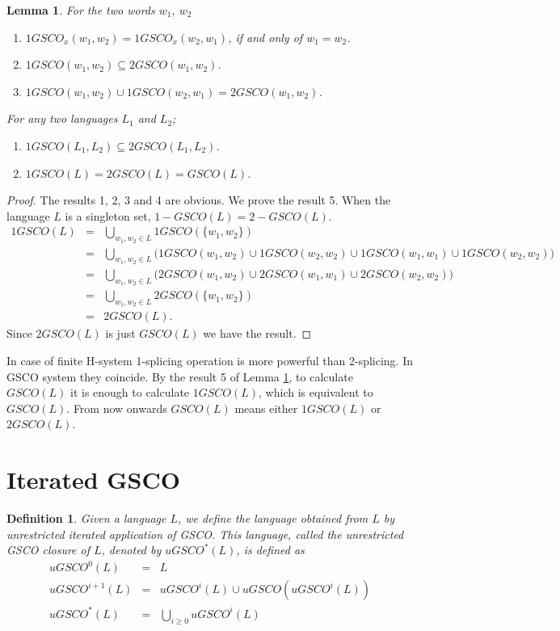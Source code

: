\documentclass{llncs}
\newtheorem{defin}{Definition}
\newtheorem{lem}{Lemma}
\begin{document}
\begin{lem}\label{mew}
For the two words $w_1,~w_2$
\begin{enumerate}
\item $1GSCO_x(w_1,w_2)=1GSCO_x(w_2,w_1)$, if and only of $w_1=w_2$.
\item $1GSCO(w_1,w_2)\subseteq2GSCO(w_1,w_2)$.
\item $1GSCO(w_1,w_2)\cup 1GSCO(w_2,w_1)=2GSCO(w_1,w_2)$.
\end{enumerate}
For any two languages $L_1$ and $L_2$;
\begin{enumerate}
\item[4.] $1GSCO(L_1,L_2)\subseteq2GSCO(L_1,L_2)$.
\item[5.] $1GSCO(L)=2GSCO(L)=GSCO(L)$.
\end{enumerate}

\end{lem}
\begin{proof}
The results 1, 2, 3 and 4 are obvious. We prove the result 5. When
the language $L$ is a singleton set, $1-GSCO(L)= 2-GSCO(L)$.
\begin{eqnarray*}
1GSCO(L)&=&\bigcup_{w_1,w_2\in L}1GSCO(\{w_1,w_2\})\\
    &=&\bigcup_{w_1,w_2\in L}\big(1GSCO(w_1,w_2)\cup1GSCO(w_2,w_2)\cup1GSCO(w_1,w_1)\cup1GSCO(w_2,w_2)\big)\\
    &=&\bigcup_{w_1,w_2\in L}\big(2GSCO(w_1,w_2)\cup2GSCO(w_1,w_1)\cup2GSCO(w_2,w_2) \big)\\
    &=&\bigcup_{w_1,w_2\in L}2GSCO(\{w_1,w_2\})\\
    &=&2GSCO(L).
\end{eqnarray*}
Since $2GSCO(L)$ is just $GSCO(L)$ we have the result.
\end{proof}
\par In case of finite H-system 1-splicing operation is more powerful than 2-splicing.
In GSCO system they coincide. By the  result 5 of Lemma \ref{mew}, to calculate $GSCO(L)$
it is enough to calculate $1GSCO(L)$, which is equivalent to  $GSCO(L)$. From now onwards
$GSCO(L)$ means either $1GSCO(L)$ or $2GSCO(L)$.
\section{Iterated GSCO}
\begin{defin}
Given a language $L$, we define the language obtained from $L$ by
unrestricted iterated application of GSCO. This language, called the
unrestricted GSCO closure of $L$, denoted by $uGSCO^*(L)$, is
defined as
\begin{eqnarray*}
uGSCO^0(L)&=&L\\
uGSCO^{i+1}(L)&=&uGSCO^{i}(L)\cup uGSCO(uGSCO^i(L))\\
uGSCO^*(L)&=&\bigcup_{i\geq0}uGSCO^{i}(L)
\end{eqnarray*}
\end{defin}
\end{document}
